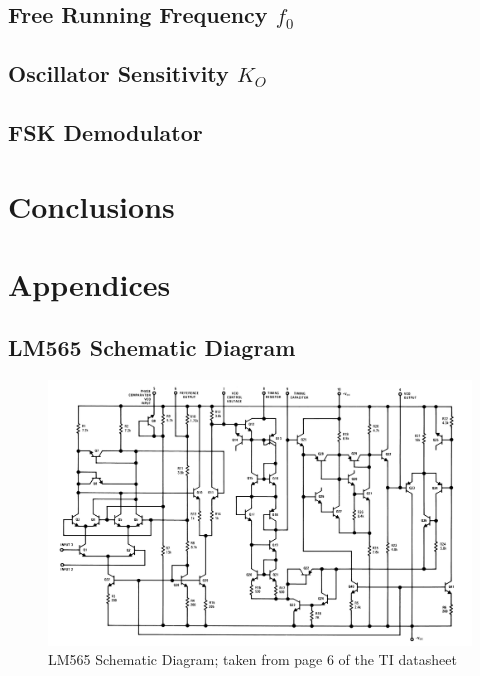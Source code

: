 \documentclass[titlepage, letterpaper, 10.5pt]{article}
\begin{document}
\subsection{Free Running Frequency $f_{0}$}

\subsection{Oscillator Sensitivity $K_{O}$}

\subsection{FSK Demodulator}

\section{Conclusions}

\section{Appendices}

\clearpage
\subsection{LM565 Schematic Diagram}
\label{lm565-schematic-diagram}

\begin{figure}[ht]
	\centering
	\includegraphics[width=1\textwidth]{diagrams/lm565-equivalent-circuit}
	\caption{LM565 Schematic Diagram; taken from page 6 of the TI datasheet}
	\label{lm565-equivalent-circuit}
\end{figure}
\end{document}
